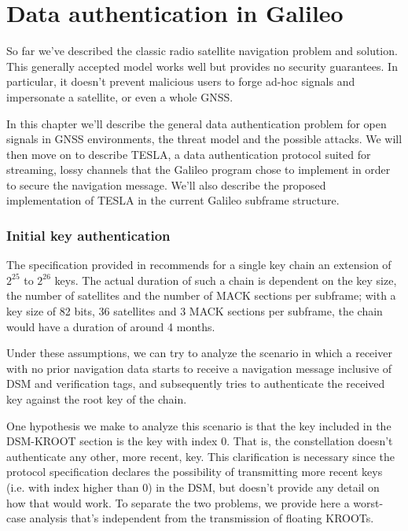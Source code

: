 
\chapter{Data authentication in Galileo}

So far we've described the classic radio satellite navigation problem and
solution. This generally accepted model works well but provides no security
guarantees. In particular, it doesn't prevent malicious users to forge ad-hoc
signals and impersonate a satellite, or even a whole GNSS.

In this chapter we'll describe the general data authentication problem for open
signals in GNSS environments, the threat model and the possible attacks. We will
then move on to describe TESLA, a data authentication protocol suited for
streaming, lossy channels that the Galileo program chose to implement in order
to secure the navigation message. We'll also describe the proposed
implementation of TESLA in the current Galileo subframe structure.


\subsection{Initial key authentication}
The specification provided in \cite{tesla_gal} recommends for a single key chain
an extension of $2^{25}$ to $2^{26}$ keys. The actual duration of such a chain
is dependent on the key size, the number of satellites and the number of MACK
sections per subframe; with a key size of 82 bits, 36 satellites and 3 MACK
sections per subframe, the chain would have a duration of around 4 months.

Under these assumptions, we can try to analyze the scenario in which a receiver
with no prior navigation data starts to receive a navigation message inclusive
of DSM and verification tags, and subsequently tries to authenticate the
received key against the root key of the chain.

One hypothesis we make to analyze this scenario is that the key included in the
DSM-KROOT section is the key with index $0$. That is, the constellation doesn't
authenticate any other, more recent, key. This clarification is necessary since
the protocol specification declares the possibility of transmitting more recent
keys (i.e. with index higher than $0$) in the DSM, but doesn't provide any
detail on how that would work. To separate the two problems, we provide here a
worst-case analysis that's independent from the transmission of floating KROOTs.

